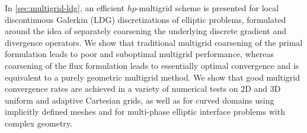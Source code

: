 In \cref{sec:multigrid-ldg}, an efficient $hp$-multigrid scheme is presented for local discontinuous Galerkin (LDG) discretizations of elliptic problems, formulated around the idea of separately coarsening the underlying discrete gradient and divergence operators. We show that traditional multigrid coarsening of the primal formulation leads to poor and suboptimal multigrid performance, whereas coarsening of the flux formulation leads to essentially optimal convergence and is equivalent to a purely geometric multigrid method. We show that good multigrid convergence rates are achieved in a variety of numerical tests on 2D and 3D uniform and adaptive Cartesian grids, as well as for curved domains using implicitly defined meshes and for multi-phase elliptic interface problems with complex geometry.

\vfill

\endgroup

\vfill
\cleardoublepage
